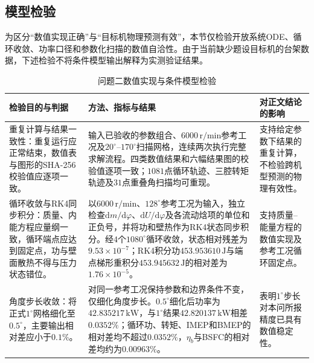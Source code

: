 \documentclass[withoutpreface,bwprint]{cumcmthesis}
\begin{document}
\subsection{模型检验}

为区分“数值实现正确”与“目标机物理预测有效”，本节仅检验开放系统ODE、循环收敛、功率口径和参数化扫描的数值自洽性。由于当前缺少题设目标机的台架数据，下述检验不将条件模型输出解释为实测验证结果。

\begin{table}[H]
\centering
\small
\caption{问题二数值实现与条件模型检验}
\label{tab:q2-verification}
\begin{tabular}{p{}p{}p{}}
\toprule
检验目的与判据 & 方法、指标与结果 & 对正文结论的影响\\
\midrule
重复计算与结果一致性：重复运行应正常结束，数值表与图形的SHA-256校验值应逐项一致。 & 输入已验收的参数组合、$6000\,\mathrm{r/min}$参考工况及$20^\circ$--$170^\circ$扫描网格，连续两次执行完整求解流程。四类数值结果和六幅结果图的校验值逐项一致；$1081$点循环轨迹、三腔转矩轨迹及$31$点重叠角扫描均可重现。 & 支持给定参数下结果的重复计算，不检验跨机型预测的物理有效性。\\
循环收敛与RK4同步积分：质量、内能方程应量纲一致，循环端点应达到固定点，功与壁面散热不得与压力状态错位。 & 以$6000\,\mathrm{r/min}$、$128^\circ$参考工况为输入，独立检查$\mathrm dm/\mathrm d\varphi$、$\mathrm dU/\mathrm d\varphi$及各流动焓项的单位和正负号，并将功和壁热作为RK4状态同步积分。经$4$个$1080^\circ$循环收敛，状态相对残差为$9.53\times10^{-7}$；RK4积分功$453.953610\,\mathrm{J}$与端点梯形重积分$453.945632\,\mathrm{J}$的相对差为$1.76\times10^{-5}$。 & 支持质量--能量方程的数值实现及参考工况循环固定点。\\
角度步长收敛：将正式$1^\circ$网格细化至$0.5^\circ$，主要输出相对差应小于$0.1\%$。 & 对同一参考工况保持参数和边界条件不变，仅细化角度步长。$0.5^\circ$细化后功率为$42.835217\,\mathrm{kW}$，与$1^\circ$结果$42.820137\,\mathrm{kW}$相差$0.0352\%$；循环功、转矩、IMEP和BMEP的相对差均不超过$0.0352\%$，$\eta_b$与BSFC的相对差均约为$0.00963\%$。 & 表明$1^\circ$步长对本问所报精度已具有数值稳定性。\\
\bottomrule
\end{tabular}
\end{table}
\end{document}
